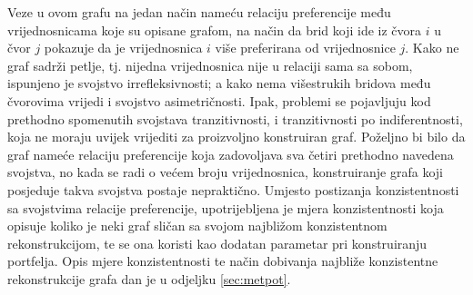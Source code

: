 \documentclass[lmodern, utf8, diplomski, numeric]{fer}
\begin{document}
  Veze u ovom grafu na jedan način nameću relaciju preferencije među vrijednosnicama koje su opisane grafom, na način da brid koji ide iz čvora $i$ u čvor $j$ pokazuje da je vrijednosnica $i$ više preferirana od vrijednosnice $j$.
  Kako ne graf sadrži petlje, tj. nijedna vrijednosnica nije u relaciji sama sa sobom, ispunjeno je svojstvo irrefleksivnosti; a kako nema višestrukih bridova među čvorovima vrijedi i svojstvo asimetričnosti.
  Ipak, problemi se pojavljuju kod prethodno spomenutih svojstava tranzitivnosti, i tranzitivnosti po indiferentnosti, koja ne moraju uvijek vrijediti za proizvoljno konstruiran graf.
  Poželjno bi bilo da graf nameće relaciju preferencije koja zadovoljava sva četiri prethodno navedena svojstva, no kada se radi o većem broju vrijednosnica, konstruiranje grafa koji posjeduje takva svojstva postaje nepraktično.
  Umjesto postizanja konzistentnosti sa svojstvima relacije preferencije, upotrijebljena je mjera konzistentnosti koja opisuje koliko je neki graf sličan sa svojom najbližom konzistentnom rekonstrukcijom, te se ona koristi kao dodatan parametar pri konstruiranju portfelja.
  Opis mjere konzistentnosti te način dobivanja najbliže konzistentne rekonstrukcije grafa dan je u odjeljku \ref{sec:metpot}.
  
  
\end{document}
